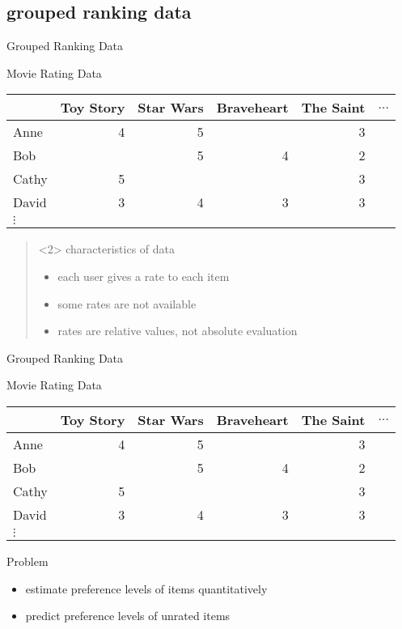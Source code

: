 \documentclass[fleqn,aspectratio=1610]{beamer}
\begin{document}
\subsection{grouped ranking data}
\label{sec:org66156e8}
\begin{frame}[label={sec:org6a1b44b}]{Grouped Ranking Data}
\begin{exampleblock}{Movie Rating Data}\label{sec:orgae59753}
\begin{center}
\begin{tabular}{l|rrrrl}
 & Toy Story & Star Wars & Braveheart & The Saint & \(\ldots\)\\[0pt]
\hline
Anne & 4 & 5 &  & 3 & \\[0pt]
Bob &  & 5 & 4 & 2 & \\[0pt]
Cathy & 5 &  &  & 3 & \\[0pt]
David & 3 & 4 & 3 & 3 & \\[0pt]
\(\vdots\) &  &  &  &  & \\[0pt]
\end{tabular}
\end{center}
\end{exampleblock}
\begin{quote}<2> %
characteristics of data
\begin{itemize}
\item each \alert{user} gives a rate to each \alert{item}
\item some rates are not available
\item rates are relative values, not absolute evaluation
\end{itemize}
\end{quote}
\end{frame}
\begin{frame}[label={sec:orgfc348fa}]{Grouped Ranking Data}
\begin{exampleblock}{Movie Rating Data}\label{sec:org023b5d1}
\begin{center}
\begin{tabular}{l|rrrrl}
 & Toy Story & Star Wars & Braveheart & The Saint & \(\ldots\)\\[0pt]
\hline
Anne & 4 & 5 &  & 3 & \\[0pt]
Bob &  & 5 & 4 & 2 & \\[0pt]
Cathy & 5 &  &  & 3 & \\[0pt]
David & 3 & 4 & 3 & 3 & \\[0pt]
\(\vdots\) &  &  &  &  & \\[0pt]
\end{tabular}
\end{center}
\end{exampleblock}
\begin{alertblock}{Problem}
\begin{itemize}
\item estimate preference levels of items quantitatively
\item predict preference levels of unrated items
\end{itemize}
\end{alertblock}
\end{frame}
\end{document}
